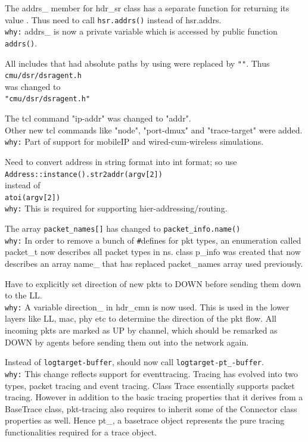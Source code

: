 \begin{flushleft}
The addrs\_ member for hdr\_sr class has a separate function for returning its value . Thus need to call {\tt hsr.addrs()} instead of hsr.addrs.\\
{\tt why:} addrs\_ is now a private variable which is accessed by public function {\tt addrs()}.


All includes that had absolute paths by using {\tt \<\>} were replaced by {\tt ""}. Thus\\
{\tt \<cmu/dsr/dsragent.h\>}\\
was changed to\\
{\tt "cmu/dsr/dsragent.h"}


The tcl command "ip-addr" was changed to "addr".\\
Other new tcl commands like "node", "port-dmux" and "trace-target" were added.\\
{\tt why:}  Part of support for mobileIP and wired-cum-wireless simulations.


Need to convert address in string format into int format; 
so use\\
{\tt Address::instance().str2addr(argv[2]) }\\
instead of \\
{\tt atoi(argv[2])}\\
{\tt why:} This is required for supporting hier-addressing/routing.


The array {\tt packet\_names[]} has changed to {\tt packet\_info.name()}\\
{\tt why:} In order to remove a bunch of {\tt #}defines for pkt types, an enumeration called packet\_t now describes all packet types in ns. class p\_info was created that now describes an array name\_ that has replaced packet\_names array used previously.


Have to explicitly set direction of new pkts to DOWN before sending them down to the LL.\\
{\tt why:} A variable direction\_ in hdr\_cmn is now used. This is used in the lower layers like LL, mac, phy etc to determine the direction of the pkt flow. All incoming pkts are marked as UP by channel, which should be remarked as DOWN by agents before sending them out into the network again.


Instead of {\tt logtarget-\>buffer}, should now call {\tt logtarget-\>pt\_-\>buffer}.\\
{\tt why:} This change reflects support for eventtracing. 
Tracing has evolved into two types, packet tracing and event tracing.
Class Trace essentially supports packet tracing. 
However in addition to the basic tracing properties that it derives from a BaseTrace class, pkt-tracing also requires to inherit some of the Connector class properties as well. Hence pt\_, a basetrace object represents the pure tracing functionalities required for a trace object.



\end{flushleft}
